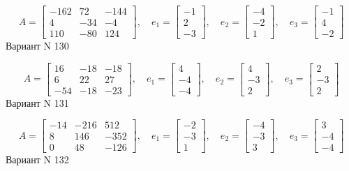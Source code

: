 \documentclass[11pt]{report}
\begin{document}
$$A = \left[\begin{matrix}-162 & 72 & -144\\4 & -34 & -4\\110 & -80 & 124\end{matrix}\right],\quad e_1 = \left[\begin{matrix}-1\\2\\-3\end{matrix}\right],\quad e_2 = \left[\begin{matrix}-4\\-2\\1\end{matrix}\right],\quad e_3 = \left[\begin{matrix}-1\\4\\-2\end{matrix}\right]$$Вариант N 130

$$A = \left[\begin{matrix}16 & -18 & -18\\6 & 22 & 27\\-54 & -18 & -23\end{matrix}\right],\quad e_1 = \left[\begin{matrix}4\\-4\\-4\end{matrix}\right],\quad e_2 = \left[\begin{matrix}4\\-3\\2\end{matrix}\right],\quad e_3 = \left[\begin{matrix}2\\-3\\2\end{matrix}\right]$$Вариант N 131

$$A = \left[\begin{matrix}-14 & -216 & 512\\8 & 146 & -352\\0 & 48 & -126\end{matrix}\right],\quad e_1 = \left[\begin{matrix}-2\\-3\\1\end{matrix}\right],\quad e_2 = \left[\begin{matrix}-4\\-3\\3\end{matrix}\right],\quad e_3 = \left[\begin{matrix}3\\-4\\-4\end{matrix}\right]$$Вариант N 132
\end{document}

